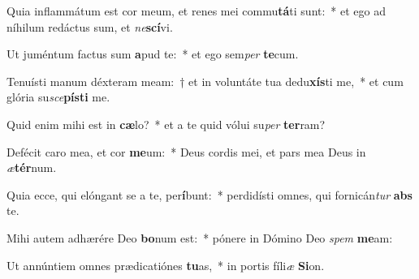 \item Quia inflammátum est cor meum, et renes mei commu\textbf{tá}ti sunt:~* et ego ad níhilum redáctus sum, et \textit{ne}\textbf{scí}vi.
\item Ut juméntum factus sum \textbf{a}pud te:~* et ego sem\textit{per} \textbf{te}cum.
\item Tenuísti manum déxteram meam:~† et in voluntáte tua dedu\textbf{xís}ti me,~* et cum glória su\textit{sce}\textbf{pís}\textbf{ti} me.
\item Quid enim mihi est in \textbf{cæ}lo?~* et a te quid vólui su\textit{per} \textbf{ter}ram?
\item Defécit caro mea, et cor \textbf{me}um:~* Deus cordis mei, et pars mea Deus in \textit{æ}\textbf{tér}num.
\item Quia ecce, qui elóngant se a te, per\textbf{í}bunt:~* perdidísti omnes, qui fornicán\textit{tur} \textbf{abs} te.
\item Mihi autem adhærére Deo \textbf{bo}num est:~* pónere in Dómino Deo \textit{spem} \textbf{me}am:
\item Ut annúntiem omnes prædicatiónes \textbf{tu}as,~* in portis fíli\textit{æ} \textbf{Si}on.
